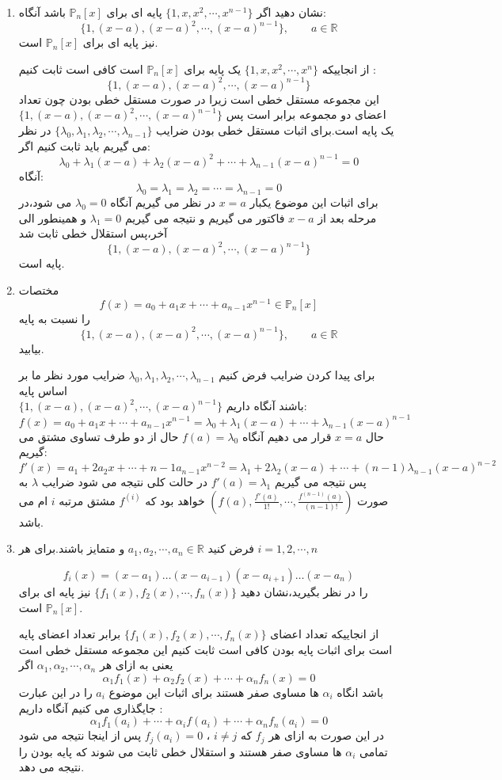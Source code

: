 \documentclass{article}
\begin{document}
\begin{enumerate}
\item 
نشان دهید  اگر 
$\{1,x,x^2,\cdots,x^{n-1}\}$
پایه ای برای 
$\mathbb{P}_n[x]$
باشد آنگاه:
$$\{1,(x-a),(x-a)^2,\cdots,(x-a)^{n-1}\},\qquad a\in \mathbb{R}$$
نیز پایه ای برای 
$\mathbb{P}_n[x]$	
است.
\begin{حل}
	از انجاییکه 
	$\{1,x,x^2,\cdots,x^n\}$
	یک پایه برای 
	$\mathbb{P}_n[x]$
	است کافی است ثابت کنیم :
	$$\{1,(x-a),(x-a)^2,\cdots,(x-a)^{n-1}\}$$
	این مجموعه مستقل خطی است زیرا در صورت مستقل خطی بودن چون تعداد اعضای دو مجموعه برابر است پس 
	$\{1,(x-a),(x-a)^2,\cdots,(x-a)^{n-1}\}$
	یک پایه است.برای اثبات مستقل خطی بودن ضرایب 
	$\{\lambda_0,\lambda_1,\lambda_2,\cdots,\lambda_{n-1}\}$
	در نظر می گیریم باید ثابت کنیم اگر:
	$$\lambda_0+\lambda_1(x-a)+\lambda_2(x-a)^2+\cdots+\lambda_{n-1}(x-a)^{n-1}=0$$
آنگاه:
$$\lambda_0=\lambda_1=\lambda_2=\cdots=\lambda_{n-1}=0$$
برای اثبات این موضوع یکبار 
$x=a$
در نظر می گیریم آنگاه 
$\lambda_0=0$
می شود،در مرحله بعد از 
$x-a$
فاکتور می گیریم و نتیجه می گیریم 
$\lambda_1=0$
و همینطور الی آخر،پس استقلال خطی ثابت شد 
 $$\{1,(x-a),(x-a)^2,\cdots,(x-a)^{n-1}\}$$
پایه است.


\end{حل}
\item
مختصات 
$$f(x)=a_0+a_1x+\cdots+a_{n-1}x^{n-1}\in \mathbb{P}_n[x]$$
را نسبت به پایه 
$$\{1,(x-a),(x-a)^2,\cdots,(x-a)^{n-1}\},\qquad a\in \mathbb{R}$$
بیابید.
\begin{حل}
برای پیدا کردن ضرایب فرض کنیم 
$\lambda_0,\lambda_1,\lambda_2,\cdots,\lambda_{n-1}$	
ضرایب مورد نظر ما بر اساس پایه 
\\
$\{1,(x-a),(x-a)^2,\cdots,(x-a)^{n-1}\}$
باشند آنگاه داریم:
$$f(x)=a_0+a_1x+\cdots+a_{n-1}x^{n-1}=\lambda_0+\lambda_1(x-a)+\cdots+\lambda_{n-1}(x-a)^{n-1}$$
حال 
$x=a$
قرار می دهیم آنگاه 
$f(a)=\lambda_0$
حال از دو طرف تساوی مشتق می گیریم:
$$f'(x)=a_1+2a_2x+\cdots+n-1a_{n-1}x^{n-2}=\lambda_1+2\lambda_2(x-a)+\cdots+(n-1)\lambda_{n-1}(x-a)^{n-2}$$
پس نتیجه می گیریم 
$f'(a)=\lambda_1$
در حالت کلی نتیجه می شود ضرایب 
$\lambda$
به صورت 
$(f(a),\frac{f'(a)}{1!},\cdots,\frac{f^{(n-1)}(a)}{(n-1)!})$
خواهد بود که 
$f^{(i)}$
مشتق مرتبه 
$i$
ام می باشد.
\end{حل}
\item 
فرض کنید 
$a_1,a_2,\cdots,a_n\in \mathbb{R}$
و متمایز باشند.برای هر 
$i=1,2,\cdots,n$

$$f_i(x)=(x-a_1)\dots(x-a_{i-1})(x-a_{i+1})\dots(x-a_n)$$
را در نظر بگیرید،نشان دهید 
$\{f_1(x),f_2(x),\cdots,f_n(x)\}$
نیز پایه ای برای 
$\mathbb{P}_n[x]$
است.
\begin{حل}
از انجاییکه تعداد اعضای 	$\{f_1(x),f_2(x),\cdots,f_n(x)\}$ برابر تعداد اعضای پایه است برای اثبات پایه بودن کافی است ثابت کنیم این مجموعه مستقل خطی است یعنی به ازای هر 
$\alpha_1,\alpha_2,\cdots,\alpha_n$
اگر 
$$\alpha_1f_1(x)+\alpha_2f_2(x)+\cdots+\alpha_nf_n(x)=0$$
باشد انگاه 
$\alpha_i$
ها مساوی صفر هستند برای اثبات این موضوع 
$a_i$
را در این عبارت جایگذاری می کنیم آنگاه داریم :
$$\alpha_1f_1(a_i)+\cdots+\alpha_if(a_i)+\cdots+\alpha_nf_n(a_i)=0$$
در این صورت به ازای هر 
$f_j$
که
$i\neq j$
،
$f_j(a_i)=0$
 پس از اینجا نتیجه می شود تمامی 
 $\alpha_i$
 ها مساوی صفر هستند و استقلال خطی ثابت می شوند که پایه بودن را نتیجه می دهد.
\end{حل}
\end{enumerate}
\end{document}
